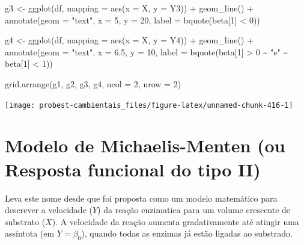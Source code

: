 \documentclass[
]{book}
\newenvironment{Shaded}{\begin{snugshade}}{\end{snugshade}}
\newcommand{\AttributeTok}[1]{\textcolor[rgb]{0.77,0.63,0.00}{#1}}
\newcommand{\DecValTok}[1]{\textcolor[rgb]{0.00,0.00,0.81}{#1}}
\newcommand{\FloatTok}[1]{\textcolor[rgb]{0.00,0.00,0.81}{#1}}
\newcommand{\FunctionTok}[1]{\textcolor[rgb]{0.00,0.00,0.00}{#1}}
\newcommand{\NormalTok}[1]{#1}
\newcommand{\OtherTok}[1]{\textcolor[rgb]{0.56,0.35,0.01}{#1}}
\newcommand{\SpecialCharTok}[1]{\textcolor[rgb]{0.00,0.00,0.00}{#1}}
\newcommand{\StringTok}[1]{\textcolor[rgb]{0.31,0.60,0.02}{#1}}
\begin{document}
\begin{Shaded}
\begin{Highlighting}[]
\NormalTok{g3 }\OtherTok{\textless{}{-}} \FunctionTok{ggplot}\NormalTok{(df, }\AttributeTok{mapping =} \FunctionTok{aes}\NormalTok{(}\AttributeTok{x =}\NormalTok{ X, }\AttributeTok{y =}\NormalTok{ Y3)) }\SpecialCharTok{+}
  \FunctionTok{geom\_line}\NormalTok{() }\SpecialCharTok{+}
  \FunctionTok{annotate}\NormalTok{(}\AttributeTok{geom =} \StringTok{"text"}\NormalTok{, }\AttributeTok{x =} \DecValTok{5}\NormalTok{, }\AttributeTok{y =} \DecValTok{20}\NormalTok{, }
           \AttributeTok{label =} \FunctionTok{bquote}\NormalTok{(beta[}\DecValTok{1}\NormalTok{] }\SpecialCharTok{\textless{}} \DecValTok{0}\NormalTok{))}

\NormalTok{g4 }\OtherTok{\textless{}{-}} \FunctionTok{ggplot}\NormalTok{(df, }\AttributeTok{mapping =} \FunctionTok{aes}\NormalTok{(}\AttributeTok{x =}\NormalTok{ X, }\AttributeTok{y =}\NormalTok{ Y4)) }\SpecialCharTok{+}
  \FunctionTok{geom\_line}\NormalTok{() }\SpecialCharTok{+}
  \FunctionTok{annotate}\NormalTok{(}\AttributeTok{geom =} \StringTok{"text"}\NormalTok{, }\AttributeTok{x =} \FloatTok{6.5}\NormalTok{, }\AttributeTok{y =} \DecValTok{10}\NormalTok{, }
           \AttributeTok{label =} \FunctionTok{bquote}\NormalTok{(beta[}\DecValTok{1}\NormalTok{] }\SpecialCharTok{\textgreater{}} \DecValTok{0} \SpecialCharTok{\textasciitilde{}} \StringTok{"e"} \SpecialCharTok{\textasciitilde{}}\NormalTok{ beta[}\DecValTok{1}\NormalTok{] }\SpecialCharTok{\textless{}} \DecValTok{1}\NormalTok{))}

\FunctionTok{grid.arrange}\NormalTok{(g1, g2, g3, g4, }\AttributeTok{ncol =} \DecValTok{2}\NormalTok{, }\AttributeTok{nrow =} \DecValTok{2}\NormalTok{)}
\end{Highlighting}
\end{Shaded}

\begin{center}\texttt{[image: probest-cambientais\_files/figure-latex/unnamed-chunk-416-1]} \end{center}

\hypertarget{modelo-de-michaelis-menten-ou-resposta-funcional-do-tipo-ii}{%
\section{Modelo de Michaelis-Menten (ou Resposta funcional do tipo II)}\label{modelo-de-michaelis-menten-ou-resposta-funcional-do-tipo-ii}}

Leva este nome desde que foi proposta como um modelo matemático para descrever a velocidade (\(Y\)) da reação enzimatica para um volume crescente de substrato (\(X\)). A velocidade da reação aumenta gradativamente até atingir uma assíntota (em \(Y = \beta_0\)), quando todas as enzimas já estão ligadas ao substrado.
\end{document}
